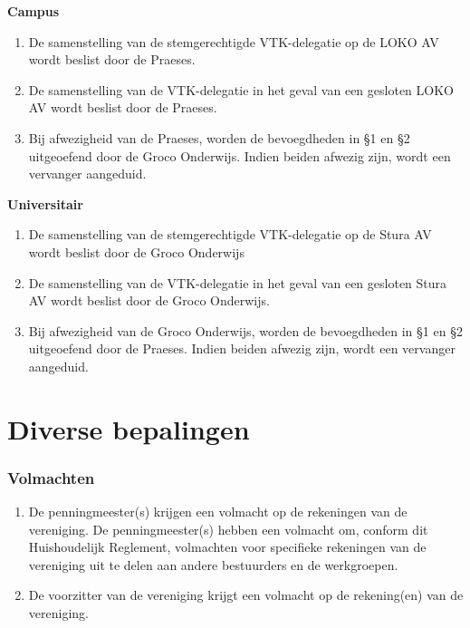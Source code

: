     \textbf{Campus}
    \begin{enumerate}
    \item  De samenstelling van de stemgerechtigde VTK-delegatie op de LOKO AV wordt beslist door de Praeses.
    \item De samenstelling van de VTK-delegatie in het geval van een gesloten LOKO AV wordt beslist door de Praeses.
    \item Bij afwezigheid van de Praeses, worden de bevoegdheden in §1 en §2 uitgeoefend door de Groco Onderwijs. Indien beiden afwezig zijn, wordt een vervanger aangeduid.
    \end{enumerate}

    \textbf{Universitair}
    \begin{enumerate}
    \item  De samenstelling van de stemgerechtigde VTK-delegatie op de Stura AV wordt beslist door de Groco Onderwijs%
    \item De samenstelling van de VTK-delegatie in het geval van een gesloten Stura AV wordt beslist door de Groco Onderwijs.
    \item Bij afwezigheid van de Groco Onderwijs, worden de bevoegdheden in §1 en §2 uitgeoefend door de Praeses. Indien beiden afwezig zijn, wordt een vervanger aangeduid.
    \end{enumerate}

\part{Diverse bepalingen}
\section{Volmachten}
    \begin{enumerate}
    \item De penningmeester(s) krijgen een volmacht op de rekeningen van de vereniging. De penningmeester(s) hebben een volmacht om, conform dit Huishoudelijk Reglement, volmachten voor specifieke rekeningen van de vereniging uit te delen aan andere bestuurders en de werkgroepen.
    \item De voorzitter van de vereniging krijgt een volmacht op de rekening(en) van de vereniging. 
    \end{enumerate}

